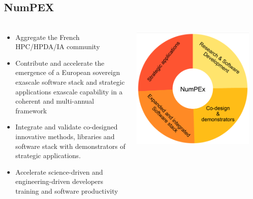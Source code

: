 \subsection*{NumPEX}
\begin{frame}
  \frametitle{\insertsectionhead}
\footnotesize
  \begin{columns}
    \begin{column}{0.5\textwidth}
      \begin{itemize}
        \item \alert{Aggregate the French HPC/HPDA/IA}
        community
        \item Contribute and accelerate the emergence of a 
        \alert{European sovereign exascale software stack and strategic applications exascale capability in a coherent and multi-annual framework}
        \item Integrate and validate \alert{co-designed} innovative methods, libraries and software stack with demonstrators of strategic applications.
        \item Accelerate science-driven and engineering-driven developers \alert{training and software  productivity}
      \end{itemize}
    \end{column}
    \begin{column}{.5\textwidth}
      \includegraphics[width=\textwidth]{../figures/numpex-objectives.png}
    \end{column}
  \end{columns}

\end{frame}

